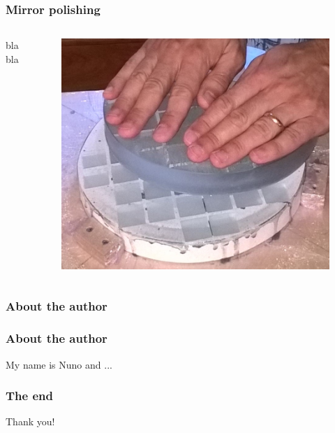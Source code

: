 \documentclass{beamer}
\begin{document}
\begin{frame}
\frametitle{Mirror polishing}
\begin{columns}
bla bla
\begin{figure}
\includegraphics[scale=0.2]{assets/grinding.jpg}
\end{figure}
\end{columns}
\end{frame}


\begin{frame}
\frametitle{About the author}

\end{frame}

\begin{frame}
\frametitle{About the author}
My name is Nuno and ...
\end{frame}

\begin{frame}
\frametitle{The end}
Thank you!
\end{frame}
\end{document}

